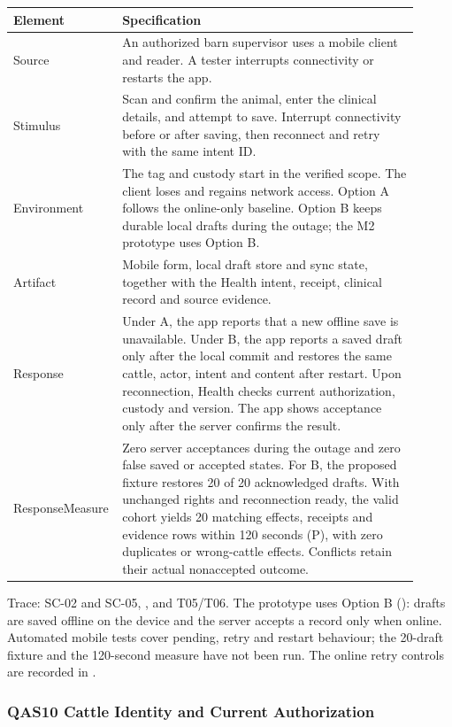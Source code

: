 {\small
\begin{longtable}{|p{0.19\linewidth}|p{0.72\linewidth}|}
\hline
\textbf{Element} & \textbf{Specification} \\ \hline
\endhead
Source & An authorized barn supervisor uses a mobile client and
reader. A tester interrupts connectivity or restarts the app. \\ \hline
Stimulus & Scan and confirm the animal, enter the clinical details, and
attempt to save. Interrupt connectivity before or after saving, then
reconnect and retry with the same intent ID. \\ \hline
Environment & The tag and custody start in the verified scope. The
client loses and regains network access. Option A follows the online-only
baseline. Option B keeps durable local drafts during the outage; the
M2 prototype uses Option B. \\ \hline
Artifact & Mobile form, local draft store and sync state, together with
the Health intent, receipt, clinical record and source evidence. \\ \hline
Response & Under A, the app reports that a new offline save is unavailable.
Under B, the app reports a saved draft only after the local commit and
restores the same cattle, actor, intent and content after restart. Upon
reconnection, Health checks current authorization, custody and version.
The app shows acceptance only after the server confirms the result. \\ \hline
Response\newline Measure & Zero server acceptances during the outage and zero
false saved or accepted states. For B, the proposed fixture restores
20 of 20 acknowledged drafts. With unchanged rights and reconnection
ready, the valid cohort yields 20 matching effects, receipts and evidence
rows within 120 seconds (P), with zero duplicates or wrong-cattle effects.
Conflicts retain their actual nonaccepted outcome. \\ \hline
\end{longtable}
}

Trace: SC-02 and SC-05, , and T05/T06. The prototype uses
Option B (): drafts are saved offline on the device
and the server accepts a record only when online. Automated mobile tests
cover pending, retry and restart behaviour; the 20-draft fixture and
the 120-second measure have not been run. The online retry controls are recorded in
.

\newpage
\subsubsection{QAS10 Cattle Identity and Current Authorization}\label{sec:qas10}

